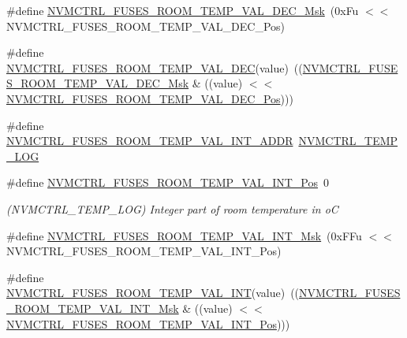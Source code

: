 \begin{DoxyCompactItemize}
\#define \mbox{\hyperlink{group__fuses__api_ga0ee859efa14d77eee478107b91eb8953}{N\+V\+M\+C\+T\+R\+L\+\_\+\+F\+U\+S\+E\+S\+\_\+\+R\+O\+O\+M\+\_\+\+T\+E\+M\+P\+\_\+\+V\+A\+L\+\_\+\+D\+E\+C\+\_\+\+Msk}}~(0x\+Fu $<$$<$ N\+V\+M\+C\+T\+R\+L\+\_\+\+F\+U\+S\+E\+S\+\_\+\+R\+O\+O\+M\+\_\+\+T\+E\+M\+P\+\_\+\+V\+A\+L\+\_\+\+D\+E\+C\+\_\+\+Pos)
\item 
\#define \mbox{\hyperlink{group__fuses__api_ga539f1e73b1dc3578d1d133756df0ea3c}{N\+V\+M\+C\+T\+R\+L\+\_\+\+F\+U\+S\+E\+S\+\_\+\+R\+O\+O\+M\+\_\+\+T\+E\+M\+P\+\_\+\+V\+A\+L\+\_\+\+D\+EC}}(value)~((\mbox{\hyperlink{group__fuses__api_ga0ee859efa14d77eee478107b91eb8953}{N\+V\+M\+C\+T\+R\+L\+\_\+\+F\+U\+S\+E\+S\+\_\+\+R\+O\+O\+M\+\_\+\+T\+E\+M\+P\+\_\+\+V\+A\+L\+\_\+\+D\+E\+C\+\_\+\+Msk}} \& ((value) $<$$<$ \mbox{\hyperlink{group__fuses__api_gab9dc4439ac02a58c79db1446ec462f97}{N\+V\+M\+C\+T\+R\+L\+\_\+\+F\+U\+S\+E\+S\+\_\+\+R\+O\+O\+M\+\_\+\+T\+E\+M\+P\+\_\+\+V\+A\+L\+\_\+\+D\+E\+C\+\_\+\+Pos}})))
\item 
\#define \mbox{\hyperlink{group__fuses__api_gab9ee95916d82d60e281cf17ec84125a2}{N\+V\+M\+C\+T\+R\+L\+\_\+\+F\+U\+S\+E\+S\+\_\+\+R\+O\+O\+M\+\_\+\+T\+E\+M\+P\+\_\+\+V\+A\+L\+\_\+\+I\+N\+T\+\_\+\+A\+D\+DR}}~\mbox{\hyperlink{group___s_a_m_d21_j18_a__base_gae900d443ec6d7cf1c90d21b6662fa447}{N\+V\+M\+C\+T\+R\+L\+\_\+\+T\+E\+M\+P\+\_\+\+L\+OG}}
\item 
\#define \mbox{\hyperlink{group__fuses__api_ga433fd1bc26aa2c728b0d82a4d831a309}{N\+V\+M\+C\+T\+R\+L\+\_\+\+F\+U\+S\+E\+S\+\_\+\+R\+O\+O\+M\+\_\+\+T\+E\+M\+P\+\_\+\+V\+A\+L\+\_\+\+I\+N\+T\+\_\+\+Pos}}~0
\begin{DoxyCompactList}\small\item\em (N\+V\+M\+C\+T\+R\+L\+\_\+\+T\+E\+M\+P\+\_\+\+L\+OG) Integer part of room temperature in oC \end{DoxyCompactList}\item 
\#define \mbox{\hyperlink{group__fuses__api_ga5119bd310c82c2058af49f619b1bee0e}{N\+V\+M\+C\+T\+R\+L\+\_\+\+F\+U\+S\+E\+S\+\_\+\+R\+O\+O\+M\+\_\+\+T\+E\+M\+P\+\_\+\+V\+A\+L\+\_\+\+I\+N\+T\+\_\+\+Msk}}~(0x\+F\+Fu $<$$<$ N\+V\+M\+C\+T\+R\+L\+\_\+\+F\+U\+S\+E\+S\+\_\+\+R\+O\+O\+M\+\_\+\+T\+E\+M\+P\+\_\+\+V\+A\+L\+\_\+\+I\+N\+T\+\_\+\+Pos)
\item 
\#define \mbox{\hyperlink{group__fuses__api_ga72e160d5c41270f351122257243b6b6c}{N\+V\+M\+C\+T\+R\+L\+\_\+\+F\+U\+S\+E\+S\+\_\+\+R\+O\+O\+M\+\_\+\+T\+E\+M\+P\+\_\+\+V\+A\+L\+\_\+\+I\+NT}}(value)~((\mbox{\hyperlink{group__fuses__api_ga5119bd310c82c2058af49f619b1bee0e}{N\+V\+M\+C\+T\+R\+L\+\_\+\+F\+U\+S\+E\+S\+\_\+\+R\+O\+O\+M\+\_\+\+T\+E\+M\+P\+\_\+\+V\+A\+L\+\_\+\+I\+N\+T\+\_\+\+Msk}} \& ((value) $<$$<$ \mbox{\hyperlink{group__fuses__api_ga433fd1bc26aa2c728b0d82a4d831a309}{N\+V\+M\+C\+T\+R\+L\+\_\+\+F\+U\+S\+E\+S\+\_\+\+R\+O\+O\+M\+\_\+\+T\+E\+M\+P\+\_\+\+V\+A\+L\+\_\+\+I\+N\+T\+\_\+\+Pos}})))

\end{DoxyCompactItemize}
